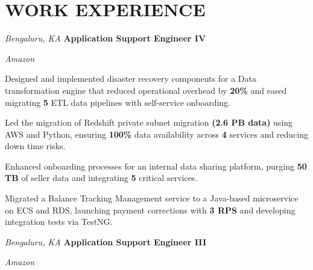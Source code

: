 \section{WORK EXPERIENCE}

\begin{twocolentry}{
    \textit{Bengaluru, KA}}
    \textbf{Application Support Engineer IV}
    
    \textit{Amazon}
\end{twocolentry}

\vspace{0.15 cm}
\begin{onecolentry}
    \begin{highlights}
        \item Designed and implemented disaster recovery components for a Data transformation engine that reduced operational overhead by \textbf{20\%} and eased migrating \textbf{5} ETL data pipelines with self-service onboarding.
        \item Led the migration of Redshift private subnet migration \textbf{(2.6 PB data)} using AWS and Python, ensuring  \textbf{100\%} data availability across \textbf{4} services and reducing down time risks.
        \item Enhanced onboarding processes for an internal data sharing platform, purging \textbf{50 TB} of seller data and integrating \textbf{5} critical services.
        \item Migrated a Balance Tracking Management service to a Java-based microservice on ECS and RDS, launching payment corrections with \textbf{3 RPS} and developing integration tests via TestNG.
    \end{highlights}
\end{onecolentry}

\vspace{0.15 cm}

\begin{twocolentry}{
    \textit{Bengaluru, KA}}
    \textbf{Application Support Engineer III}
    
    \textit{Amazon}
\end{twocolentry}

\vspace{0.15 cm}

